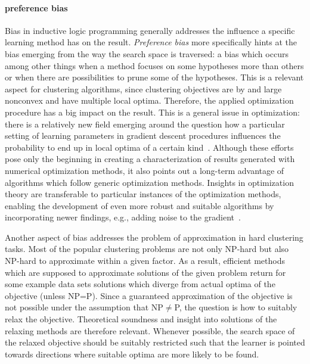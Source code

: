 \paragraph{preference bias} Bias in inductive logic programming generally addresses the influence a specific learning method has on the result. \emph{Preference bias} more specifically hints at the bias emerging from the way the search space is traversed: a bias which occurs among other things when a method focuses on some hypotheses more than others or when there are possibilities to prune some of the hypotheses.  
This is a relevant aspect for clustering algorithms, since clustering objectives are by and large nonconvex and have multiple local optima. Therefore, the applied optimization procedure has a big impact on the result. This is a general issue in optimization: there is a relatively new field emerging around the question how a particular setting of learning parameters 
in gradient descent procedures influences the probability to end up in local optima of a certain kind~\citep{henning2012quasi,henning2015probabilistic}. Although these efforts pose only the beginning in creating a characterization of results generated with numerical optimization methods, it also points out a long-term advantage of algorithms which follow generic optimization methods. Insights in optimization theory are transferable to particular instances of the optimization methods, enabling the development of even more robust and suitable algorithms by incorporating newer findings, e.g., adding noise to the gradient~\citep{jin2017escape,hennig2013fast}.

Another aspect of bias addresses the problem of approximation in hard clustering tasks. Most of the popular clustering problems are not only NP-hard but also NP-hard to approximate within a given factor. As a result, efficient methods which are supposed to approximate solutions of the given problem return for some example data sets solutions which diverge from actual optima of the objective (unless NP=P). Since a guaranteed approximation of the objective is not possible under the assumption that NP$\neq$P, the question is how to suitably relax the objective. Theoretical soundness and insight into solutions of the relaxing methods are therefore relevant. Whenever possible, the search space of the relaxed objective should be suitably restricted such that the learner is pointed towards directions where suitable optima are more likely to be found. 

